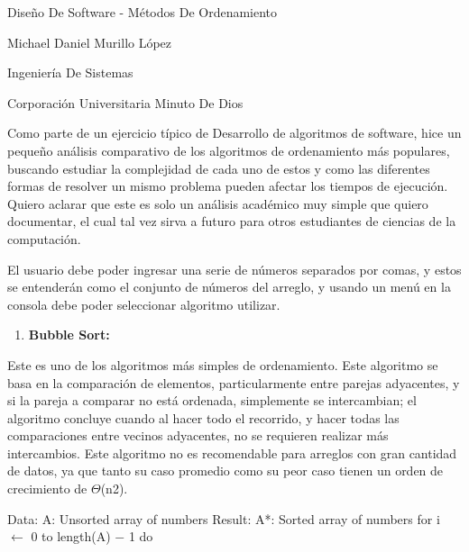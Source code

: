 \documentclass{article} %
\begin{document}


\noindent 

\noindent 

\noindent 

\noindent 

\noindent 

\noindent Dise\~{n}o De Software - M\'{e}todos De Ordenamiento

\noindent Michael Daniel Murillo L\'{o}pez

\noindent Ingenier\'{i}a De Sistemas

\noindent Corporaci\'{o}n Universitaria Minuto De Dios

\noindent 

\noindent Como parte de un ejercicio t\'{i}pico de Desarrollo de algoritmos de software, hice un peque\~{n}o an\'{a}lisis comparativo de los algoritmos de ordenamiento m\'{a}s populares, buscando estudiar la complejidad de cada uno de estos y como las diferentes formas de resolver un mismo problema pueden afectar los tiempos de ejecuci\'{o}n. Quiero aclarar que este es solo un an\'{a}lisis acad\'{e}mico muy simple que quiero documentar, el cual tal vez sirva a futuro para otros estudiantes de ciencias de la computaci\'{o}n.

\noindent El usuario debe poder ingresar una serie de n\'{u}meros separados por comas, y estos se entender\'{a}n como el conjunto de n\'{u}meros del arreglo, y usando un men\'{u} en la consola debe poder seleccionar algoritmo utilizar.

\begin{enumerate}
\item  \textbf{Bubble Sort:}
\end{enumerate}

\noindent Este es uno de los algoritmos m\'{a}s simples de ordenamiento. Este algoritmo se basa en la comparaci\'{o}n de elementos, particularmente entre parejas adyacentes, y si la pareja a comparar no est\'{a} ordenada, simplemente se intercambian; el algoritmo concluye cuando al hacer todo el recorrido, y hacer todas las comparaciones entre vecinos adyacentes, no se requieren realizar m\'{a}s intercambios.  Este algoritmo no es recomendable para arreglos con gran cantidad de datos, ya que tanto su caso promedio como su peor caso tienen un orden de crecimiento de $\Theta$(n2).

\noindent 

\noindent Data: A: Unsorted array of numbers Result: A*: Sorted array of numbers for i $\mathrm{\leftarrow}$ 0 to length(A) $\mathrm{-}$ 1 do
\end{document}
